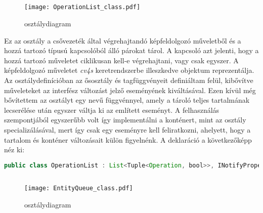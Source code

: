\subsection{} \label{subs:OperationList}

\begin{figure}[h]
\texttt{[image: OperationList\_class.pdf]}
\centering
\caption{ osztálydiagram}
\label{fig:operation_list_class_diagram}
\end{figure}

Ez az osztály a csővezeték által végrehajtandó képfeldolgozó műveletből és a hozzá tartozó típusú kapcsolóból álló párokat tárol. A kapcsoló azt jelenti, hogy a hozzá tartozó műveletet ciklikusan kell-e végrehajtani, vagy csak egyszer. A képfeldolgozó műveletet \emph{cv4s} keretrendszerbe illeszkedve  objektum reprezentálja. Az osztálydefinícióban az ősosztály  és  tagfüggvényeit definiáltam felül, kibővítve műveleteket az  interfész változást jelző eseményének kiváltásával. Ezen kívül még bővítettem az osztályt egy  nevű függvénnyel, amely a tároló teljes tartalmának lecserélése után egyszer váltja ki az említett eseményt. A felhasználás szempontjából egyszerűbb volt így implementálni a konténert, mint az  osztály specializálásával, mert így csak egy eseményre kell feliratkozni, ahelyett, hogy a tartalom és konténer változásait külön figyelnénk.  A deklaráció a következőképp néz ki:

\begin{mdframed}[backgroundcolor=gray!20]
\begin{small}
\begin{scriptsize}
\begin{lstlisting}[language=java]
public class OperationList : List<Tuple<Operation, bool>>, INotifyPropertyChanged
\end{lstlisting}
\end{scriptsize}
\end{small}
\end{mdframed}

\subsection{}

\begin{figure}[h]
\texttt{[image: EntityQueue\_class.pdf]}
\centering
\caption{ osztálydiagram}
\label{fig:entity_queue_class_diagram}
\end{figure}

